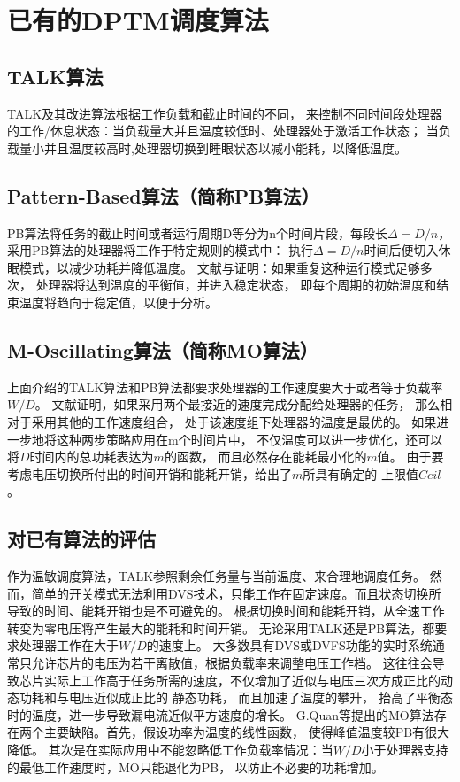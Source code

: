 \section{已有的DPTM调度算法}
\label{sec:algorithms}
\subsection{TALK算法}
TALK及其改进算法根据工作负载和截止时间的不同， 来控制不同时间段处理器的工作/休息状态：当负载量大并且温度较低时、处理器处于激活工作状态； 当负载量小并且温度较高时,处理器切换到睡眼状态以减小能耗，以降低温度。

\subsection{Pattern-Based算法（简称PB算法）}

PB算法将任务的截止时间或者运行周期D等分为n个时间片段，每段长$\Delta=D/n$， 采用PB算法的处理器将工作于特定规则的模式中： 执行$\Delta=D/n$时间后便切入休眠模式，以减少功耗并降低温度。 文献与证明：如果重复这种运行模式足够多次， 处理器将达到温度的平衡值，并进入稳定状态， 即每个周期的初始温度和结束温度将趋向于稳定值，以便于分析。

\subsection{M-Oscillating算法（简称MO算法）}

上面介绍的TALK算法和PB算法都要求处理器的工作速度要大于或者等于负载率$W/D$。 文献证明，如果采用两个最接近的速度完成分配给处理器的任务， 那么相对于采用其他的工作速度组合， 处于该速度组下处理器的温度是最优的。 如果进一步地将这种两步策略应用在m个时间片中， 不仅温度可以进一步优化，还可以将$D$时间内的总功耗表达为$m$的函数， 而且必然存在能耗最小化的$m$值。 由于要考虑电压切换所付出的时间开销和能耗开销，给出了$m$所具有确定的 上限值$Ceil$。

\subsection{对已有算法的评估}
作为温敏调度算法，TALK参照剩余任务量与当前温度、来合理地调度任务。 然而，简单的开关模式无法利用DVS技术，只能工作在固定速度。而且状态切换所导致的时间、能耗开销也是不可避免的。 根据切换时间和能耗开销，从全速工作转变为零电压将产生最大的能耗和时间开销。
无论采用TALK还是PB算法，都要求处理器工作在大于$W/D$的速度上。 大多数具有DVS或DVFS功能的实时系统通常只允许芯片的电压为若干离散值，根据负载率来调整电压工作档。 这往往会导致芯片实际上工作高于任务所需的速度，不仅增加了近似与电压三次方成正比的动态功耗和与电压近似成正比的 静态功耗， 而且加速了温度的攀升， 抬高了平衡态时的温度，进一步导致漏电流近似平方速度的增长。
G.Quan等提出的MO算法存在两个主要缺陷。首先，假设功率为温度的线性函数， 使得峰值温度较PB有很大降低。 其次是在实际应用中不能忽略低工作负载率情况：当$W/D$小于处理器支持的最低工作速度时，MO只能退化为PB， 以防止不必要的功耗增加。

